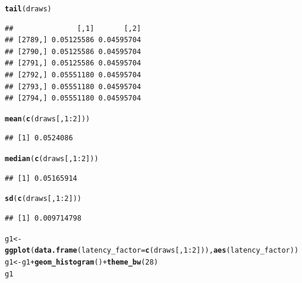 \documentclass{article}\usepackage[]{graphicx}\usepackage[]{color}
\makeatletter
\newcommand{\hlnum}[1]{\textcolor[rgb]{0.686,0.059,0.569}{#1}}%
\newcommand{\hlopt}[1]{\textcolor[rgb]{0,0,0}{#1}}%
\newcommand{\hlstd}[1]{\textcolor[rgb]{0.345,0.345,0.345}{#1}}%
\newcommand{\hlkwb}[1]{\textcolor[rgb]{0.69,0.353,0.396}{#1}}%
\newcommand{\hlkwc}[1]{\textcolor[rgb]{0.333,0.667,0.333}{#1}}%
\newcommand{\hlkwd}[1]{\textcolor[rgb]{0.737,0.353,0.396}{\textbf{#1}}}%
\newenvironment{kframe}{%
 \def\at@end@of@kframe{}%
 \ifinner\ifhmode%
  \def\at@end@of@kframe{\end{minipage}}%
  \begin{minipage}{\columnwidth}%
 \fi\fi%
 \def\FrameCommand##1{\hskip\@totalleftmargin \hskip-\fboxsep
 \colorbox{shadecolor}{##1}\hskip-\fboxsep
     \hskip-\linewidth \hskip-\@totalleftmargin \hskip\columnwidth}%
 \MakeFramed {\advance\hsize-\width
   \@totalleftmargin\z@ \linewidth\hsize
   \@setminipage}}%
 {\par\unskip\endMakeFramed%
 \at@end@of@kframe}
\newenvironment{knitrout}{}{} %
\makeatother
\begin{document}
\begin{knitrout}
\color{fgcolor}\begin{kframe}
\begin{alltt}
\hlkwd{tail}\hlstd{(draws)}
\end{alltt}
\begin{verbatim}
##               [,1]       [,2]
## [2789,] 0.05125586 0.04595704
## [2790,] 0.05125586 0.04595704
## [2791,] 0.05125586 0.04595704
## [2792,] 0.05551180 0.04595704
## [2793,] 0.05551180 0.04595704
## [2794,] 0.05551180 0.04595704
\end{verbatim}
\begin{alltt}
\hlkwd{mean}\hlstd{(}\hlkwd{c}\hlstd{(draws[,} \hlnum{1}\hlopt{:}\hlnum{2}\hlstd{]))}
\end{alltt}
\begin{verbatim}
## [1] 0.0524086
\end{verbatim}
\begin{alltt}
\hlkwd{median}\hlstd{(}\hlkwd{c}\hlstd{(draws[,} \hlnum{1}\hlopt{:}\hlnum{2}\hlstd{]))}
\end{alltt}
\begin{verbatim}
## [1] 0.05165914
\end{verbatim}
\begin{alltt}
\hlkwd{sd}\hlstd{(}\hlkwd{c}\hlstd{(draws[,} \hlnum{1}\hlopt{:}\hlnum{2}\hlstd{]))}
\end{alltt}
\begin{verbatim}
## [1] 0.009714798
\end{verbatim}
\begin{alltt}
\hlstd{g1} \hlkwb{<-} \hlkwd{ggplot}\hlstd{(}\hlkwd{data.frame}\hlstd{(}\hlkwc{latency_factor} \hlstd{=} \hlkwd{c}\hlstd{(draws[,} \hlnum{1}\hlopt{:}\hlnum{2}\hlstd{])),} \hlkwd{aes}\hlstd{(latency_factor))}
\hlstd{g1} \hlkwb{<-} \hlstd{g1} \hlopt{+} \hlkwd{geom_histogram}\hlstd{()} \hlopt{+} \hlkwd{theme_bw}\hlstd{(}\hlnum{28}\hlstd{)}
\hlstd{g1}
\end{alltt}



\end{kframe}
\end{knitrout}
\end{document}

